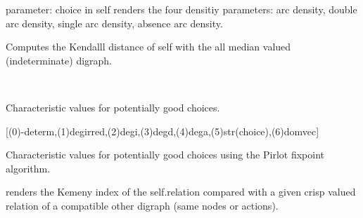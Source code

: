 \documentclass[letterpaper,10pt,english]{sphinxmanual}
\begin{document}
\begin{fulllineitems}
\begin{fulllineitems}
\label{techDoc:digraphs.Digraph.computeDensities}
parameter: choice in self
renders the four densitiy parameters:
arc density, double arc density, single arc density, absence arc density.

\end{fulllineitems}


\begin{fulllineitems}
\label{techDoc:digraphs.Digraph.computeDeterminateness}
Computes the Kendalll distance of self
with the all median valued (indeterminate) digraph.

\end{fulllineitems}


\begin{fulllineitems}
\label{techDoc:digraphs.Digraph.computeGoodChoices}~
\begin{DUlineblock}{0em}
\item[] Characteristic values for potentially good choices.
\item[] {[}(0)-determ,(1)degirred,(2)degi,(3)degd,(4)dega,(5)str(choice),(6)domvec{]}
\end{DUlineblock}

\end{fulllineitems}


\begin{fulllineitems}
\label{techDoc:digraphs.Digraph.computeGoodPirlotChoices}
Characteristic values for potentially good choices
using the Pirlot fixpoint algorithm.

\end{fulllineitems}


\begin{fulllineitems}
\label{techDoc:digraphs.Digraph.computeKemenyIndex}
renders the Kemeny index of the self.relation
compared with a given crisp valued relation of a compatible
other digraph (same nodes or actions).


\end{fulllineitems}
\end{fulllineitems}
\end{document}
